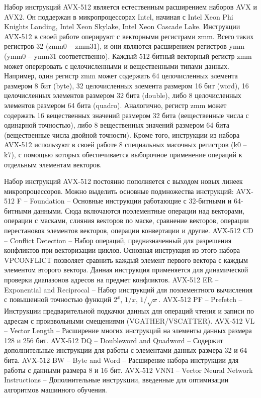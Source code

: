 \documentclass[
11pt,%
tightenlines,%
twoside,%
onecolumn,%
nofloats,%
nobibnotes,%
nofootinbib,%
superscriptaddress,%
noshowpacs,%
centertags]%
{revtex4}
\begin{document}
Набор инструкций AVX-512 \cite{IntelDev} является естественным расширением наборов AVX и AVX2.
Он поддержан в микропроцессорах Intel, начиная с Intel Xeon Phi Knights Landing, Intel Xeon Skylake, Intel Xeon Cascade Lake.
Инструкции AVX-512 в своей работе оперируют с векторными регистрами zmm.
Всего таких регистров 32 (zmm0 -- zmm31), и они являются расширением регистров ymm (ymm0 -- ymm31 соответственно).
Каждый 512-битный векторный регистр zmm может оперировать с целочисленными и вещественными типами данных.
Например, один регистр zmm может содержать 64 целочисленных элемента размером 8 бит (byte), 32 целочисленных элемента размером 16 бит (word), 16 целочисленных элементов размером 32 бита (double), либо 8 целочисленных элементов размером 64 бита (quadro).
Аналогично, регистр zmm может содержать 16 вещественных значений размером 32 бита (вещественные числа с одинарной точностью), либо 8 вещественных значений размером 64 бита (вещественные числа двойной точности).
Кроме того, инструкции из набора AVX-512 используют в своей работе 8 специальных масочных регистров (k0 -- k7), с помощью которых обеспечивается выборочное применение операций к отдельным элементам векторов.
    
Набор инструкций AVX-512 постоянно пополняется с выходом новых линеек микропроцессоров.
Можно выделить основные подмножества инструкций:
AVX-512 F -- Foundation -- Основные инструкции работающие с 32-битными и 64-битными данными.
Сюда включаются поэлементные операции над векторами, операции с масками, слияния векторов по маске, сравнение векторов, операции перестановок элементов векторов, операции конвертации и другие.
AVX-512 CD -- Conflict Detection -- Набор операций, предназначенный для разрешения конфликтов при векторизации циклов. Основная инструкция из этого набора VPCONFLICT позволяет сравнить каждый элемент первого вектора с каждым элементом второго вектора. Данная инструкция применяется для динамической проверки диапазонов адресов на предмет конфликтов.
AVX-512 ER -- Exponential and Reciprocal -- Набор инструкций для поэлементного вычисления с повышенной точностью функций $2^x$, $1/x$, $1/\sqrt{x}$.
AVX-512 PF -- Prefetch -- Инструкции предварительной подкачки данных для операций чтения и записи по адресам с произвольными смещениями (VGATHER/VSCATTER).
AVX-512 VL -- Vector Length -- Расширение многих инструкций на элементы данных размера 128 и 256 бит.
AVX-512 DQ -- Doubleword and Quadword -- Содержит дополнительные инструкции для работы с элементами данных размера 32 и 64 бита.
AVX-512 BW -- Byte and Word -- Расширение набора инструкции для работы с данными размера 8 и 16 бит. 
AVX-512 VNNI -- Vector Neural Network Instructions -- Дополнительные инструкции, введенные для оптимизации алгоритмов машинного обучения.
\end{document}
